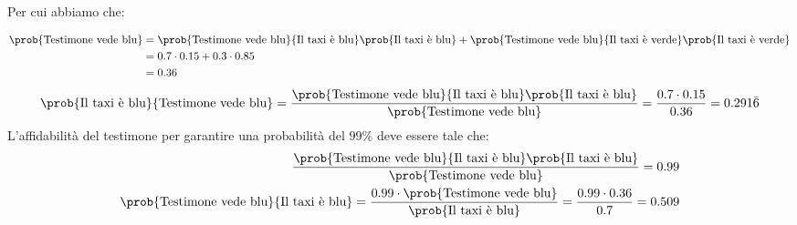 \documentclass[\main/main.tex]{subfiles}
\begin{document}
Per cui abbiamo che:

\begin{align*}
  \prob{\text{Testimone vede blu}} & = \prob{\text{Testimone vede blu}}{\text{Il taxi è blu}}\prob{{\text{Il taxi è blu}}} +  \prob{\text{Testimone vede blu}}{\text{Il taxi è verde}}\prob{{\text{Il taxi è verde}}} \\
                                   & = 0.7\cdot0.15+0.3\cdot0.85                                                                                                                                                      \\
                                   & = 0.36
\end{align*}
\begin{align*}
  \prob{\text{Il taxi è blu}}{\text{Testimone vede blu}} = \frac{\prob{\text{Testimone vede blu}}{\text{Il taxi è blu}}\prob{{\text{Il taxi è blu}}}}{\prob{\text{Testimone vede blu}}} = \frac{0.7\cdot 0.15}{0.36} = 0.291\bar{6}
\end{align*}
L'affidabilità del testimone per garantire una probabilità del $99\%$ deve essere tale che:
\begin{align*}
  \frac{\prob{\text{Testimone vede blu}}{\text{Il taxi è blu}}\prob{{\text{Il taxi è blu}}}}{\prob{\text{Testimone vede blu}}} = 0.99 \\
  \prob{\text{Testimone vede blu}}{\text{Il taxi è blu}} = \frac{0.99\cdot\prob{\text{Testimone vede blu}}}{\prob{{\text{Il taxi è blu}}}} = \frac{0.99\cdot 0.36}{0.7} = 0.509
\end{align*}
\end{document}
